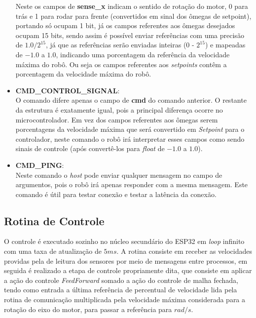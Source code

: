 \begin{itemize}
        
        
        Neste os campos de \textbf{sense\_x} indicam o sentido de rotação do motor, 0 para trás e 1 para rodar para frente (convertidos em sinal dos ômegas de setpoint), portando só ocupam 1 bit, já os campos referentes aos ômegas desejados ocupam 15 bits, sendo assim é possível enviar referências com uma precisão de $1.0/2^{15}$, já que as referências serão enviadas inteiras  (0 - $2^{15}$) e mapeadas de $-1.0$ a $1.0$, indicando uma porcentagem da referência da velocidade máxima do robô. Ou seja os campos referentes aos \textit{setpoints} contêm a porcentagem da velocidade máxima do robô.
        
    \item \textbf{CMD\_CONTROL\_SIGNAL}:\\
        
        O comando difere apenas o campo de \textbf{cmd} do comando anterior. O restante da estrutura é exatamente igual, pois a principal diferença ocorre no microcontrolador. Em vez dos campos referentes aos ômegas serem porcentagens da velocidade máxima que será convertido em \textit{Setpoint} para o controlador, neste comando o robô irá interpretar esses campos como sendo sinais de controle (após convertê-los para \emph{float} de $-1.0$ a $1.0$).
        
    \item \textbf{CMD\_PING}:\\
        Neste comando o \textit{host} pode enviar qualquer mensagem no campo de argumentos, pois o robô irá apenas responder com a mesma mensagem. Este comando é útil para testar conexão e testar a latência da conexão.
    
\end{itemize}



\subsection{Rotina de Controle}
O controle é executado sozinho no núcleo secundário do ESP32 em \emph{loop} infinito com uma taxa de atualização de $5ms$. A rotina consiste em receber as velocidades providas pela de leitura dos sensores por meio de mensagens entre processos, em seguida é realizado a etapa de controle propriamente dita, que consiste em aplicar a ação do controle \textit{FeedForward} somado a ação do controle de malha fechada, tendo como entrada a última referência de percentual de velocidade lida pela rotina de comunicação multiplicada pela velocidade máxima considerada para a rotação do eixo do motor, para passar a referência para $rad/s$. \\

